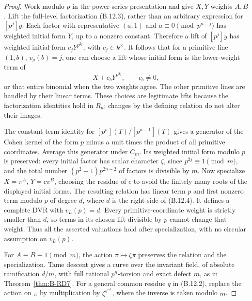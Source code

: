 \begin{proof}
Work modulo $p$ in the power-series presentation and give $X,Y$
weights $A,B$. Lift the full-level factorization (B.12.3), rather than
an arbitrary expression for $[p^j]y$. Each factor with representative
$(a,1)$ and $a\equiv0\pmod {p^{n-j}}$ has weighted initial form $Y$,
up to a nonzero constant. Therefore a lift of $[p^j]y$ has weighted
initial form $c_jY^{p^{2j}}$, with $c_j\in k^\times$. It follows that
for a primitive line $(1,b)$, $v_p(b)=j$, one can choose a lift whose
initial form is the lower-weight term of
\[
 X+c_bY^{p^{2j}},\qquad c_b\ne0,
\]
or that entire binomial when the two weights agree. The other
primitive lines are handled by their linear terms. These choices are
legitimate lifts because the factorization identities hold in $R_n$;
changes by the defining relation do not alter their images.

The constant-term identity for $[p^n](T)/[p^{n-1}](T)$ gives a generator
of the Cohen kernel of the form $p$ minus a unit times the product of
all primitive coordinates. Average this generator under $C_m$.
Its weighted initial form modulo $p$ is preserved: every initial
factor has scalar character $\zeta$, since
$p^{2j}\equiv1\pmod m$, and the total number
$(p^2-1)p^{2n-2}$ of factors is divisible by $m$.
Now specialize $X=\pi^A$, $Y=c\pi^B$, choosing the residue of $c$
to avoid the finitely many roots of the displayed initial forms.
The resulting relation has linear term $p$ and first nonzero term
modulo $p$ of degree $d$, where $d$ is the right side of (B.12.4).
It defines a complete DVR with $v_L(p)=d$.
Every primitive-coordinate weight is strictly smaller than $d$, so
terms in its chosen lift divisible by $p$ cannot change that weight.
Thus all the asserted valuations hold after specialization, with no
circular assumption on $v_L(p)$.

For $A\equiv B\equiv1\pmod m$, the action $\pi\mapsto\zeta\pi$
preserves the relation and the specialization. Tame descent gives a
curve over the invariant field, of absolute ramification $d/m$,
with full rational $p^n$-torsion and exact defect $m$, as in
Theorem~\ref{thm:B-RD7}. For a general common residue $q$ in
(B.12.2), replace the action on $\pi$ by multiplication by
$\zeta^{q^{-1}}$, where the inverse is taken modulo $m$.


\end{proof}

